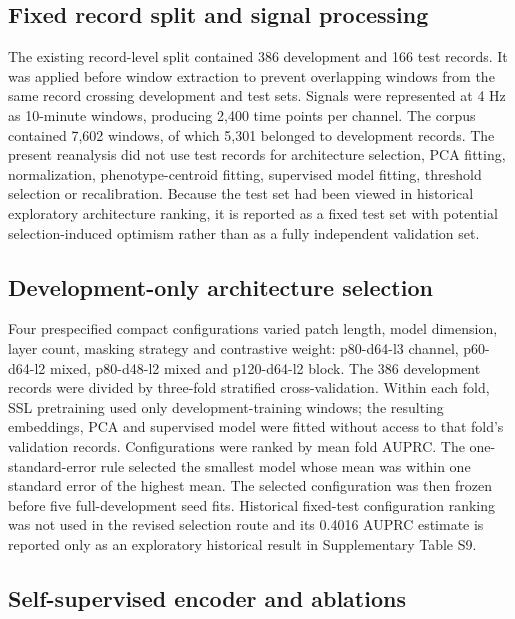 \documentclass[utf8]{FrontiersinHarvard}
\begin{document}
\subsection{Fixed record split and signal processing}

The existing record-level split contained 386 development and 166 test records. It was applied before window extraction to prevent overlapping windows from the same record crossing development and test sets. Signals were represented at 4 Hz as 10-minute windows, producing 2,400 time points per channel. The corpus contained 7,602 windows, of which 5,301 belonged to development records. The present reanalysis did not use test records for architecture selection, PCA fitting, normalization, phenotype-centroid fitting, supervised model fitting, threshold selection or recalibration. Because the test set had been viewed in historical exploratory architecture ranking, it is reported as a fixed test set with potential selection-induced optimism rather than as a fully independent validation set.

\subsection{Development-only architecture selection}

Four prespecified compact configurations varied patch length, model dimension, layer count, masking strategy and contrastive weight: p80-d64-l3 channel, p60-d64-l2 mixed, p80-d48-l2 mixed and p120-d64-l2 block. The 386 development records were divided by three-fold stratified cross-validation. Within each fold, SSL pretraining used only development-training windows; the resulting embeddings, PCA and supervised model were fitted without access to that fold's validation records. Configurations were ranked by mean fold AUPRC. The one-standard-error rule selected the smallest model whose mean was within one standard error of the highest mean. The selected configuration was then frozen before five full-development seed fits. Historical fixed-test configuration ranking was not used in the revised selection route and its 0.4016 AUPRC estimate is reported only as an exploratory historical result in Supplementary Table S9.

\subsection{Self-supervised encoder and ablations}
\end{document}
